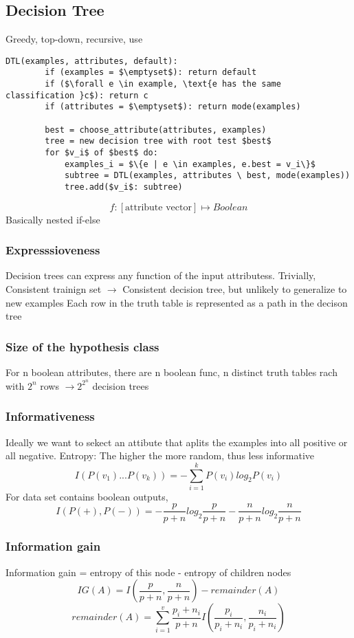 \documentclass{article}
\begin{document}
\subsection[Supervised]{Decision Tree}
Greedy, top-down, recursive, use
\begin{lstlisting}[mathescape=true]
    DTL(examples, attributes, default):
        if (examples = $\emptyset$): return default
        if ($\forall e \in example, \text{e has the same classification }c$): return c
        if (attributes = $\emptyset$): return mode(examples)

        best = choose_attribute(attributes, examples)
        tree = new decision tree with root test $best$
        for $v_i$ of $best$ do:
            examples_i = $\{e | e \in examples, e.best = v_i\}$
            subtree = DTL(examples, attributes \ best, mode(examples))
            tree.add($v_i$: subtree)
    \end{lstlisting}
\[f: [\text{attribute vector}] \mapsto Boolean\]
Basically nested if-else 

\subsubsection*{Expresssioveness }
Decision trees can express any function of the input attributess. Trivially, Consistent trainign set $\rightarrow$ Consistent decision tree, but unlikely to generalize to new examples\newline
Each row in the truth table is represented as a path in the decison tree 
\subsubsection*{Size of the hypothesis class}
For n boolean attributes, there are n boolean func, n distinct truth tables rach with $2^n$ rows $\rightarrow 2^{2^n}$ decision trees
\subsubsection*{Informativeness}
Ideally we want to sekect an attibute that aplits the examples into all positive or all negative.\newline
Entropy: The higher the more random, thus less informative
\[I(P(v_1)...P(v_k)) = -\sum_{i=1}^{k} P(v_i)log_2P(v_i)\]
For data set contains boolean outputs, 
\[I(P(+), P(-)) = -\frac{p}{p + n}log_2 \frac{p}{p + n} - \frac{n}{p+n}log_2\frac{n}{p+n}\]
\subsubsection*{Information gain}
Information gain = entropy of this node - entropy of children nodes
\[IG(A) = I(\frac{p}{p + n}, \frac{n}{p + n}) - remainder(A)\]
\[remainder(A) = \sum_{i=1}^{v}\frac{p_i + n_i}{p + n}I(\frac{p_i}{p_i + n_i}, \frac{n_i}{p_i + n_i})\]
\end{document}
